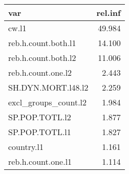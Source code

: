 \begin{tabular}{lr}
  \hline
var & rel.inf \\ 
  \hline
cw.l1 & 49.984 \\ 
  reb.h.count.both.l1 & 14.100 \\ 
  reb.h.count.both.l2 & 11.006 \\ 
  reb.h.count.one.l2 & 2.443 \\ 
  SH.DYN.MORT.l48.l2 & 2.259 \\ 
  excl\_groups\_count.l2 & 1.984 \\ 
  SP.POP.TOTL.l2 & 1.877 \\ 
  SP.POP.TOTL.l1 & 1.827 \\ 
  country.l1 & 1.161 \\ 
  reb.h.count.one.l1 & 1.114 \\ 
   \hline
\end{tabular}

